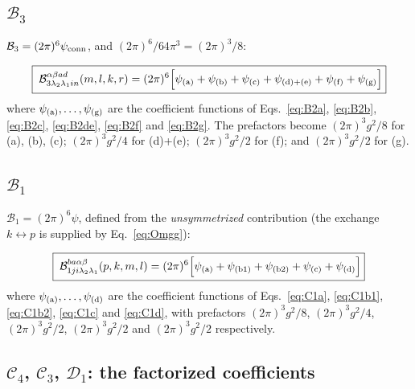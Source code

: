 \documentclass[11pt]{article}
\newcommand{\B}{\mathcal{B}}
\newcommand{\C}{\mathcal{C}}
\newcommand{\D}{\mathcal{D}}
\begin{document}
\subsection{$\B_{3}$}
$\B_{3}=(2\pi)^{6}\psi_{\rm conn}$, and $(2\pi)^{6}/64\pi^{3}=(2\pi)^{3}/8$:
\begin{res}
\begin{equation}
\boxed{\;\B^{\alpha\beta ad}_{3\lambda_{2}\lambda_{1}in}(m,l,k,r)
=(2\pi)^{6}\Big[\psi_{\rm(a)}+\psi_{\rm(b)}+\psi_{\rm(c)}+\psi_{\rm(d)+(e)}
+\psi_{\rm(f)}+\psi_{\rm(g)}\Big]}
\label{eq:B3}
\end{equation}
where $\psi_{\rm(a)},\dots,\psi_{\rm(g)}$ are the coefficient functions of
Eqs.~\eqref{eq:B2a}, \eqref{eq:B2b}, \eqref{eq:B2c}, \eqref{eq:B2de}, \eqref{eq:B2f} and
\eqref{eq:B2g}. The prefactors become $(2\pi)^{3}g^{2}/8$ for (a), (b), (c);
$(2\pi)^{3}g^{2}/4$ for (d)+(e); $(2\pi)^{3}g^{2}/2$ for (f); and
$(2\pi)^{3}g^{2}/2$ for (g).
\end{res}

\subsection{$\B_{1}$}
$\B_{1}=(2\pi)^{6}\psi$, defined from the \emph{unsymmetrized} contribution (the exchange
$k\leftrightarrow p$ is supplied by Eq.~\eqref{eq:Omgg}):
\begin{res}
\begin{equation}
\boxed{\;\B^{ba\alpha\beta}_{1ji\lambda_{2}\lambda_{1}}(p,k,m,l)
=(2\pi)^{6}\Big[\psi_{\rm(a)}+\psi_{\rm(b1)}+\psi_{\rm(b2)}+\psi_{\rm(c)}+\psi_{\rm(d)}\Big]}
\label{eq:B1}
\end{equation}
where $\psi_{\rm(a)},\dots,\psi_{\rm(d)}$ are the coefficient functions of
Eqs.~\eqref{eq:C1a}, \eqref{eq:C1b1}, \eqref{eq:C1b2}, \eqref{eq:C1c} and \eqref{eq:C1d},
with prefactors $(2\pi)^{3}g^{2}/8$, $(2\pi)^{3}g^{2}/4$, $(2\pi)^{3}g^{2}/2$,
$(2\pi)^{3}g^{2}/2$ and $(2\pi)^{3}g^{2}/2$ respectively.
\end{res}

\subsection{$\C_{4}$, $\C_{3}$, $\D_{1}$: the factorized coefficients}
\end{document}

